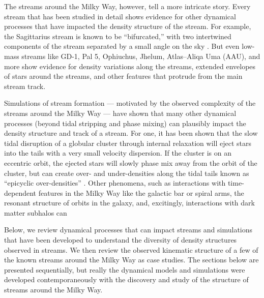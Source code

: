 \documentclass[final,5p,times,twocolumn,authoryear]{elsarticle}
\begin{document}
The streams around the Milky Way, however, tell a more intricate story.
Every stream that has been studied in detail shows evidence for other dynamical
processes that have impacted the density structure of the stream.
For example, the Sagittarius stream is known to be ``bifurcated,'' with two intertwined
components of the stream separated by a small angle on the sky
\citep[e.g.,][]{belokurov:2006}.
But even low-mass streams like GD-1, Pal 5, Ophiuchus, Jhelum, Atlas--Aliqa Uma (AAU), and more show evidence for density variations along the streams,  extended envelopes of stars around the streams, and other features that protrude from the main stream track.

Simulations of stream formation --- motivated by the observed complexity of the streams
around the Milky Way --- have shown that many other dynamical processes (beyond tidal
stripping and phase mixing) can plausibly impact the density structure and track of a
stream.
For one, it has been shown that the slow tidal disruption of a globular cluster through
internal relaxation will eject stars into the tails with a very small velocity
dispersion.
If the cluster is on an eccentric orbit, the ejected stars will slowly phase mix away
from the orbit of the cluster, but can create over- and under-densities along the tidal
tails known as ``epicyclic over-densities'' \citep{kupper:2010}.
Other phenomena, such as interactions with time-dependent features in the Milky Way like
the galactic bar or spiral arms, the resonant structure of orbits in the galaxy, and,
excitingly, interactions with dark matter subhalos can 

Below, we review dynamical processes that can impact streams and simulations that have
been developed to understand the diversity of density structures observed in streams.
We then review the observed kinematic structure of a few of the known streams around the
Milky Way as case studies.
The sections below are presented sequentially, but really the dynamical models and
simulations were developed contemporaneously with the discovery and study of the
structure of streams around the Milky Way.
\end{document}
